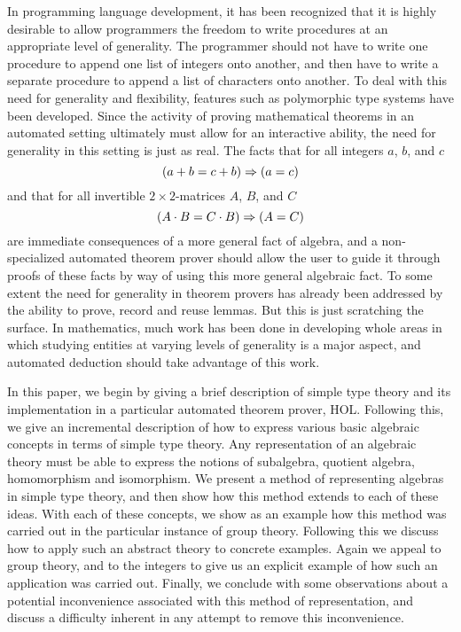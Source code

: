 In programming language development, it has been recognized that it is
highly desirable to allow programmers the freedom to write procedures
at an appropriate level of generality.  The programmer should not have
to write one procedure to append one list of integers onto another,
and then have to write a separate procedure to append a list of
characters onto another.  To deal with this need for generality and
flexibility, features such as polymorphic type systems have been
developed.  Since the activity of proving mathematical theorems in an
automated setting ultimately must allow for an interactive ability,
the need for generality in this setting is just as real.  The facts
that for all integers $a$, $b$, and $c$
$$(a + b = c + b) \Rightarrow (a = c)$$
and that for all invertible $2\times 2$-matrices $A$, $B$, and $C$
$$(A \cdot B = C \cdot B) \Rightarrow (A = C)$$
are immediate consequences of a more general fact of algebra, and a
non-specialized automated theorem prover should allow the user to
guide it through proofs of these facts by way of using this more
general algebraic fact.  To some extent the need for generality in
theorem provers has already been addressed by the ability to prove,
record and reuse lemmas.  But this is just scratching the surface.  In
mathematics, much work has been done in developing whole areas in which
studying entities at varying levels of generality is a major aspect,
and automated deduction should take advantage of this work.

In this paper, we begin by giving a brief description of simple type
theory and its implementation in a particular automated theorem prover,
HOL.  Following this, we give an incremental description of how to
express various basic algebraic concepts in terms of simple type
theory.  Any representation of an algebraic theory must be able to
express the notions of subalgebra, quotient algebra, homomorphism and
isomorphism.  We present a method of representing algebras in simple
type theory, and then show how this method extends to each of these
ideas.  With each of these concepts, we show as an example how this
method was carried out in the particular instance of group theory.
Following this we discuss how to apply such an abstract theory to
concrete examples.  Again we appeal to group theory, and to the
integers to give us an explicit example of how such an application was
carried out.  Finally, we conclude with some observations about a
potential inconvenience associated with this method of representation,
and discuss a difficulty inherent in any attempt to remove this
inconvenience.

